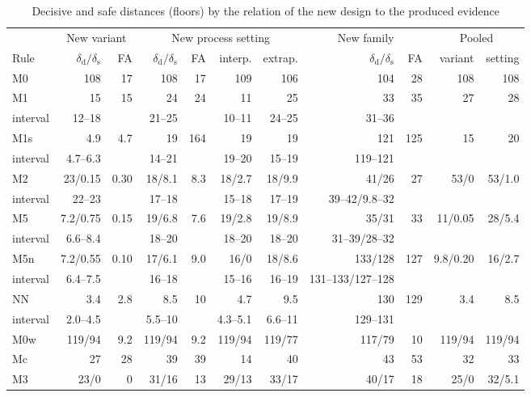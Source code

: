 \documentclass[pdflatex,sn-basic,lineno]{sn-jnl}
\newcommand{\tabsize}{\fontsize{8}{9.5}\selectfont}
\begin{document}
\begin{table}[t]
\tabsize
\setlength{\tabcolsep}{1.9pt}
\caption{Decisive and safe distances (floors) by the relation of the new design to the produced evidence}\label{tab:distances}
\begin{tabular}{@{}lrrrrrrrrrr@{}}
\toprule
 & \multicolumn{2}{c}{New variant} & \multicolumn{4}{c}{New process setting} & \multicolumn{2}{c}{New family} & \multicolumn{2}{c}{Pooled} \\
\cmidrule(lr){2-3}\cmidrule(lr){4-7}\cmidrule(lr){8-9}\cmidrule(lr){10-11}
Rule & $\delta_\mathrm{d}/\delta_\mathrm{s}$ & FA & $\delta_\mathrm{d}/\delta_\mathrm{s}$ & FA & interp. & extrap. & $\delta_\mathrm{d}/\delta_\mathrm{s}$ & FA & variant & setting \\
\midrule
M0 & 108 & 17 & 108 & 17 & 109 & 106 & 104 & 28 & 108 & 108 \\
M1 & 15 & 15 & 24 & 24 & 11 & 25 & 33 & 35 & 27 & 28 \\
\quad interval & 12--18 &  & 21--25 &  & 10--11 & 24--25 & 31--36 &  &  & \\
M1s & 4.9 & 4.7 & 19 & 164 & 19 & 19 & 121 & 125 & 15 & 20 \\
\quad interval & 4.7--6.3 &  & 14--21 &  & 19--20 & 15--19 & 119--121 &  &  & \\
M2 & 23/0.15 & 0.30 & 18/8.1 & 8.3 & 18/2.7 & 18/9.9 & 41/26 & 27 & 53/0 & 53/1.0 \\
\quad interval & 22--23 &  & 17--18 &  & 15--18 & 17--19 & 39--42/9.8--32 &  &  & \\
M5 & 7.2/0.75 & 0.15 & 19/6.8 & 7.6 & 19/2.8 & 19/8.9 & 35/31 & 33 & 11/0.05 & 28/5.4 \\
\quad interval & 6.6--8.4 &  & 18--20 &  & 18--20 & 18--20 & 31--39/28--32 &  &  & \\
M5n & 7.2/0.55 & 0.10 & 17/6.1 & 9.0 & 16/0 & 18/8.6 & 133/128 & 127 & 9.8/0.20 & 16/2.7 \\
\quad interval & 6.4--7.5 &  & 16--18 &  & 15--16 & 16--19 & 131--133/127--128 &  &  & \\
NN & 3.4 & 2.8 & 8.5 & 10 & 4.7 & 9.5 & 130 & 129 & 3.4 & 8.5 \\
\quad interval & 2.0--4.5 &  & 5.5--10 &  & 4.3--5.1 & 6.6--11 & 129--131 &  &  & \\
\midrule M0w & 119/94 & 9.2 & 119/94 & 9.2 & 119/94 & 119/77 & 117/79 & 10 & 119/94 & 119/94 \\
Mc & 27 & 28 & 39 & 39 & 14 & 40 & 43 & 53 & 32 & 33 \\
M3 & 23/0 & 0 & 31/16 & 13 & 29/13 & 33/17 & 40/17 & 18 & 25/0 & 32/5.1 \\

\end{tabular}
\end{table}
\end{document}
